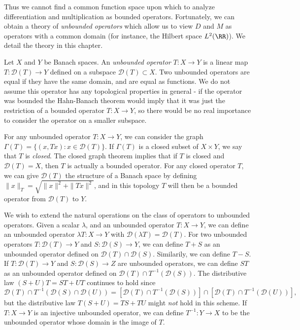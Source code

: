 Thus we cannot find a common function space upon which to analyze differentiation and multiplication as bounded operators. Fortunately, we can obtain a theory of \emph{unbounded operators} which allow us to view $D$ and $M$ as operators with a common domain (for instance, the Hilbert space $L^2(\RR)$). We detail the theory in this chapter.

Let $X$ and $Y$ be Banach spaces. An \emph{unbounded operator} $T: X \to Y$ is a linear map $T: \mathcal{D}(T) \to Y$ defined on a subspace $\mathcal{D}(T) \subset X$. Two unbounded operators are equal if they have the same domain, and are equal as functions. We do not assume this operator has any topological properties in general - if the operator was bounded the Hahn-Banach theorem would imply that it was just the restriction of a bounded operator $T: X \to Y$, so there would be no real importance to consider the operator on a smaller subspace.

For any unbounded operator $T: X \to Y$, we can consider the graph $\Gamma(T) = \{ (x,Tx): x \in \mathcal{D}(T) \}$. If $\Gamma(T)$ is a closed subset of $X \times Y$, we say that $T$ is \emph{closed}. The closed graph theorem implies that if $T$ is closed and $\mathcal{D}(T) = X$, then $T$ is actually a bounded operator. For any closed operator $T$, we can give $\mathcal{D}(T)$ the structure of a Banach space by defining $\| x \|_T = \sqrt{\| x \|^2 + \| Tx \|^2}$, and in this topology $T$ will then be a bounded operator from $\mathcal{D}(T)$ to $Y$.

We wish to extend the natural operations on the class of operators to unbounded operators. Given a scalar $\lambda$, and an unbounded operator $T: X \to Y$, we can define an unbounded operator $\lambda T: X \to Y$ with $\mathcal{D}(\lambda T) = \mathcal{D}(T)$. For two unbounded operators $T: \mathcal{D}(T) \to Y$ and $S: \mathcal{D}(S) \to Y$, we can define $T + S$ as an unbounded operator defined on $\mathcal{D}(T) \cap \mathcal{D}(S)$. Similarily, we can define $T - S$. If $T: \mathcal{D}(T) \to Y$ and $S: \mathcal{D}(S) \to Z$ are unbounded operators, we can define $ST$ as an unbounded operator defined on $\mathcal{D}(T) \cap T^{-1}(\mathcal{D}(S))$. The distributive law $(S + U)T = ST + UT$ continues to hold since
%
\[ \mathcal{D}(T) \cap T^{-1}(\mathcal{D}(S) \cap \mathcal{D}(U)) = \left[ \mathcal{D}(T) \cap T^{-1}(\mathcal{D}(S)) \right] \cap \left[ \mathcal{D}(T) \cap T^{-1}(\mathcal{D}(U)) \right], \]
%
but the distributive law $T(S + U) = TS + TU$ might \emph{not} hold in this scheme. If $T: X \to Y$ is an injective unbounded operator, we can define $T^{-1}: Y \to X$ to be the unbounded operator whose domain is the image of $T$.

